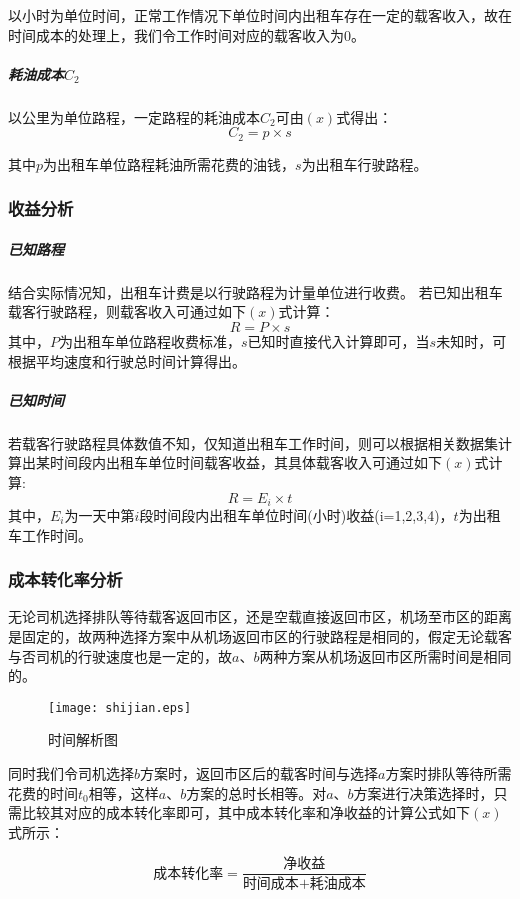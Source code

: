 \documentclass[withoutpreface,bwprint]{cumcmthesis} %
\begin{document}
以小时为单位时间，正常工作情况下单位时间内出租车存在一定的载客收入，故在时间成本的处理上，我们令工作时间对应的载客收入为$0$。

\subparagraph{耗油成本$C_2$}以公里为单位路程，一定路程的耗油成本$C_2$可由$(x)$式得出：
\begin{equation}
C_2=p\times s
\end{equation}

其中$p$为出租车单位路程耗油所需花费的油钱，$s$为出租车行驶路程。

\subsubsection{收益分析}

\subparagraph{已知路程}结合实际情况知，出租车计费是以行驶路程为计量单位进行收费。
若已知出租车载客行驶路程，则载客收入可通过如下$(x)$式计算：
\begin{equation}
R=P\times s
\end{equation}
其中，$P$为出租车单位路程收费标准，$s$已知时直接代入计算即可，当$s$未知时，可根据平均速度和行驶总时间计算得出。

\subparagraph{已知时间}
若载客行驶路程具体数值不知，仅知道出租车工作时间，则可以根据相关数据集计算出某时间段内出租车单位时间载客收益，其具体载客收入可通过如下$(x)$式计算:
\begin{equation}
R=E_i\times t
\end{equation}
其中，$E_i$为一天中第$i$段时间段内出租车单位时间(小时)收益(i=1,2,3,4)，$t$为出租车工作时间。

\subsubsection{成本转化率分析}
无论司机选择排队等待载客返回市区，还是空载直接返回市区，机场至市区的距离是固定的，故两种选择方案中从机场返回市区的行驶路程是相同的，假定无论载客与否司机的行驶速度也是一定的，故$a$、$b$两种方案从机场返回市区所需时间是相同的。

 \begin{figure}[H]
  	\centering
	\texttt{[image: shijian.eps]}
  	\caption{时间解析图}
  \end{figure}


同时我们令司机选择$b$方案时，返回市区后的载客时间与选择$a$方案时排队等待所需花费的时间$t_0$相等，这样$a$、$b$方案的总时长相等。对$a$、$b$方案进行决策选择时，只需比较其对应的成本转化率即可，其中成本转化率和净收益的计算公式如下$(x)$式所示：

\begin{equation}
\mbox{成本转化率}=\frac {\mbox{净收益}} {\mbox{时间成本}+\mbox{耗油成本}}
\end{equation}
\end{document}
